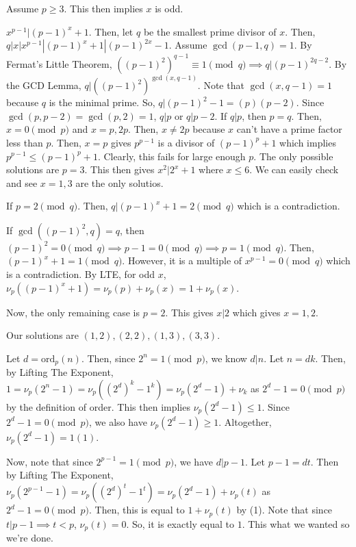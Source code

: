 \documentclass[11pt]{article}
\begin{document}
\begin{sol}
Assume $p\ge 3$. This then implies $x$ is odd.

$x^{p-1}|(p-1)^{x}+1$. Then, let $q$ be the smallest prime divisor of $x$. Then, $q|x|x^{p-1}|(p-1)^{x}+1|(p-1)^{2x}-1$. Assume $\gcd(p-1,q)=1$. By Fermat's Little Theorem, $((p-1)^2)^{q-1}\equiv 1\pmod{q}\implies q|(p-1)^{2q-2}$. By the GCD Lemma, $q|((p-1)^2)^{\gcd(x,q-1)}$. Note that $\gcd(x,q-1)=1$ because $q$ is the minimal prime. So, $q|(p-1)^2-1=(p)(p-2)$. Since $\gcd(p,p-2)=\gcd(p,2)=1$, $q|p$ or $q|p-2$.  If $q|p$, then $p=q$. Then, $x=0\pmod{p}$ and $x=p,2p$. Then, $x\neq 2p$ because $x$ can't have a prime factor less than $p$. Then, $x=p$ gives $p^{p-1}$ is a divisor of $(p-1)^{p}+1$ which implies $p^{p-1}\leq (p-1)^{p}+1$. Clearly, this fails for large enough $p$. The only possible solutions are $p=3$.  This then gives $x^2|2^{x}+1$ where $x\leq 6$. We can easily check and see $x=1,3$ are the only solutios.

If $p=2\pmod{q}$. Then, $q|(p-1)^{x}+1=2\pmod{q}$ which is a contradiction.

If $\gcd((p-1)^2,q)=q$, then$(p-1)^2=0\pmod{q}\implies p-1=0\pmod{q}\implies p=1\pmod{q}$. Then, $(p-1)^{x}+1=1\pmod{q}$. However, it is a multiple of $x^{p-1}=0\pmod{q}$ which is a contradiction.
By LTE, for odd $x$, $\nu_{p}((p-1)^{x}+1)=\nu_{p}(p)+\nu_{p}(x)=1+\nu_{p}(x)$.


Now, the only remaining case is $p=2$. This gives $x|2$ which gives $x=1,2$.

Our solutions are $\boxed{(1,2),(2,2),(1,3),(3,3)}$. 
\end{sol}


\begin{sol}
Let $d=\text{ord}_{p}(n)$. Then, since $2^{n}=1\pmod{p}$, we know $d|n$. Let $n=dk$. Then, by Lifting The Exponent, $1=\nu_{p}(2^{n}-1)=\nu_{p}((2^{d})^{k}-1^{k})=\nu_{p}(2^{d}-1)+\nu_{k}$ as $2^{d}-1=0\pmod{p}$ by the definition of order. This then implies $\nu_{p}(2^{d}-1)\leq 1$. Since $2^{d}-1=0\pmod{p}$, we also have $\nu_{p}(2^{d}-1)\ge 1$. Altogether, $\nu_{p} (2^{d}-1)=1 (1)$.

Now, note that since $2^{p-1}=1\pmod{p}$, we have $d|p-1$. Let $p-1=dt$. Then by Lifting The Exponent, $\nu_{p}(2^{p-1}-1)=\nu_{p}((2^{d})^{t}-1^{t})=\nu_{p}(2^{d}-1) +\nu_{p}(t)$ as $2^{d}-1=0\pmod{p}$. Then, this is equal to $1+\nu_{p}(t)$ by (1). Note that since $t|p-1\implies t<p$, $\nu_{p}(t)=0$. So, it is exactly equal to $1$. This what we wanted so we're done.
\end{sol}
\end{document}
